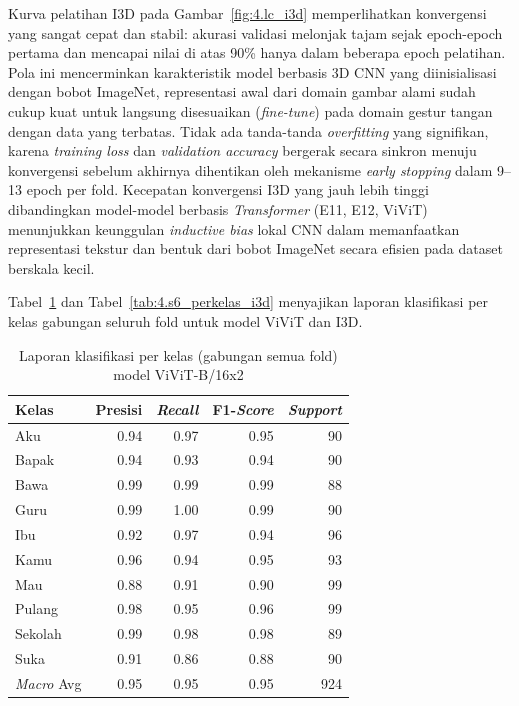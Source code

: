 Kurva pelatihan I3D pada Gambar~\ref{fig:4.lc_i3d} memperlihatkan konvergensi yang sangat cepat dan stabil: akurasi validasi melonjak tajam sejak epoch-epoch pertama dan mencapai nilai di atas 90\% hanya dalam beberapa epoch pelatihan. Pola ini mencerminkan karakteristik model berbasis 3D CNN yang diinisialisasi dengan bobot ImageNet, representasi awal dari domain gambar alami sudah cukup kuat untuk langsung disesuaikan (\textit{fine-tune}) pada domain gestur tangan dengan data yang terbatas. Tidak ada tanda-tanda \textit{overfitting} yang signifikan, karena \textit{training loss} dan \textit{validation accuracy} bergerak secara sinkron menuju konvergensi sebelum akhirnya dihentikan oleh mekanisme \textit{early stopping} dalam 9--13 epoch per fold. Kecepatan konvergensi I3D yang jauh lebih tinggi dibandingkan model-model berbasis \textit{Transformer} (E11, E12, ViViT) menunjukkan keunggulan \textit{inductive bias} lokal CNN dalam memanfaatkan representasi tekstur dan bentuk dari bobot ImageNet secara efisien pada dataset berskala kecil.\par

Tabel~\ref{tab:4.s6_perkelas_vivit} dan Tabel~\ref{tab:4.s6_perkelas_i3d} menyajikan laporan klasifikasi per kelas gabungan seluruh fold untuk model ViViT dan I3D.\par

\begin{table}[H]
\centering
\caption{Laporan klasifikasi per kelas (gabungan semua fold) model ViViT-B/16x2}
\label{tab:4.s6_perkelas_vivit}
\footnotesize
\begin{tabular}{|l|r|r|r|r|}
\hline
Kelas & \multicolumn{1}{c|}{Presisi} & \multicolumn{1}{c|}{\textit{Recall}} & \multicolumn{1}{c|}{F1-\textit{Score}} & \multicolumn{1}{c|}{\textit{Support}} \\
\hline
Aku     & 0.94 & 0.97 & 0.95 & 90 \\
Bapak   & 0.94 & 0.93 & 0.94 & 90 \\
Bawa    & 0.99 & 0.99 & 0.99 & 88 \\
Guru    & 0.99 & 1.00 & 0.99 & 90 \\
Ibu     & 0.92 & 0.97 & 0.94 & 96 \\
Kamu    & 0.96 & 0.94 & 0.95 & 93 \\
Mau     & 0.88 & 0.91 & 0.90 & 99 \\
Pulang  & 0.98 & 0.95 & 0.96 & 99 \\
Sekolah & 0.99 & 0.98 & 0.98 & 89 \\
Suka    & 0.91 & 0.86 & 0.88 & 90 \\
\hline
\textit{Macro} Avg & 0.95 & 0.95 & 0.95 & 924 \\
\hline
\end{tabular}
\end{table}

